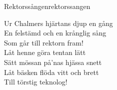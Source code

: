 \begin{song}{Rektorssången}{rektorssangen}
\begin{vers}
Ur Chalmers hjärtans djup en gång\\
En felstämd och en krånglig sång\\
Som går till rektorn fram!   \\
Låt henne göra tentan lätt\\
Sätt mössan på'nas hjässa snett\\
Låt bäsken flöda vitt och brett\\
Till törstig teknolog!\\
\end{vers}
\end{song}

